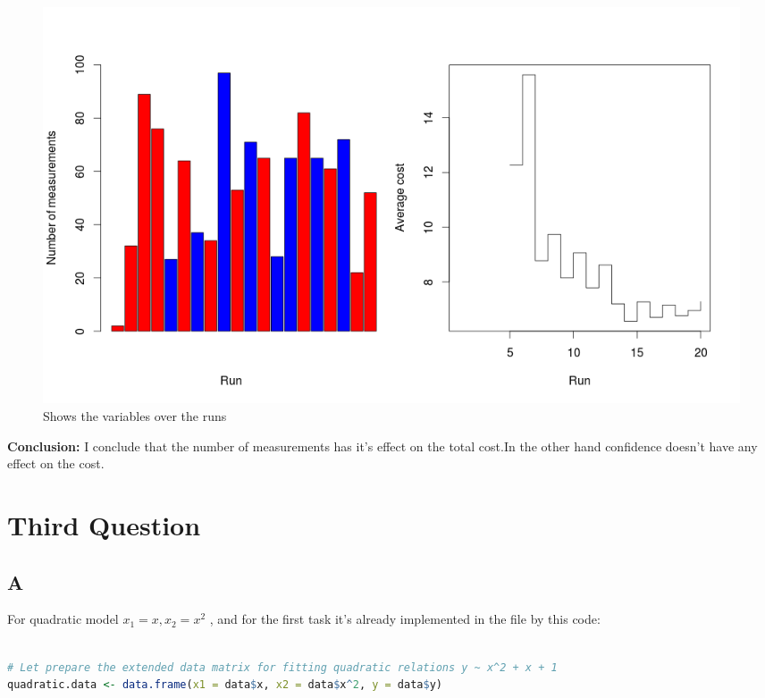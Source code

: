 \documentclass{article}
\begin{document}
\begin{multicols*}{2}
\begin{flushleft}
\begin{flushleft}
\begin{figure}[H]
	\begin{center}
		\includegraphics[scale=0.2]{plotm2p2.png}
	\end{center}
	\caption{Shows the variables over the runs}
\end{figure}
\textbf{Conclusion:} I conclude that the number of measurements has it's effect on the total cost.In the other hand confidence doesn't have any effect on the cost.
\end{flushleft}
{\centering \section*{Third Question}}
{\centering\subsection*{A}}
\begin{flushleft}

For quadratic model \(x_1 = x,x_2 = x^2\) , and for the first task it's already implemented in the file by this code:
\begin{lstlisting}[language=R]

# Let prepare the extended data matrix for fitting quadratic relations y ~ x^2 + x + 1
quadratic.data <- data.frame(x1 = data$x, x2 = data$x^2, y = data$y)


\end{lstlisting}
\end{flushleft}
\end{flushleft}
\end{multicols*}
\end{document}

